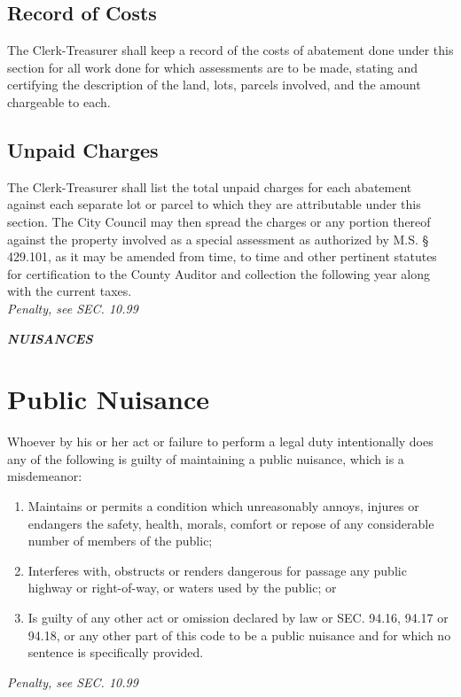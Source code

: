 \documentclass[code.tex]{subfiles}
\begin{document}
\subsection{Record of Costs}
The Clerk-Treasurer shall keep a record of the costs of abatement done under this section for all work done for which assessments are to be made, stating and certifying the description of the land, lots, parcels involved, and the amount chargeable to each.
\subsection{Unpaid Charges}
The Clerk-Treasurer shall list the total unpaid charges for each abatement against each separate lot or parcel to which they are attributable under this section. The City Council may then spread the charges or any portion thereof against the property involved as a special assessment as authorized by M.S. § 429.101, as it may be amended from time, to time and other pertinent statutes for certification to the County Auditor and collection the following year along with the current taxes.\\
\emph{Penalty, see SEC. 10.99}


\begin{center}
\emph{\textbf{\LARGE{NUISANCES}}}
\end{center}
\setcounter{section}{14}
\section{Public Nuisance}
Whoever by his or her act or failure to perform a legal duty intentionally does any of the following is guilty of maintaining a public nuisance, which is a misdemeanor:
\begin{enumerate}[{\indent}A)]
    \item Maintains or permits a condition which unreasonably annoys, injures or endangers the safety, health, morals, comfort or repose of any considerable number of members of the public;
    \item Interferes with, obstructs or renders dangerous for passage any public highway or right-of-way, or waters used by the public; or
    \item Is guilty of any other act or omission declared by law or SEC. 94.16, 94.17 or 94.18, or any other part of this code to be a public nuisance and for which no sentence is specifically provided.
\end{enumerate}
\emph{Penalty, see SEC. 10.99}
\end{document}
